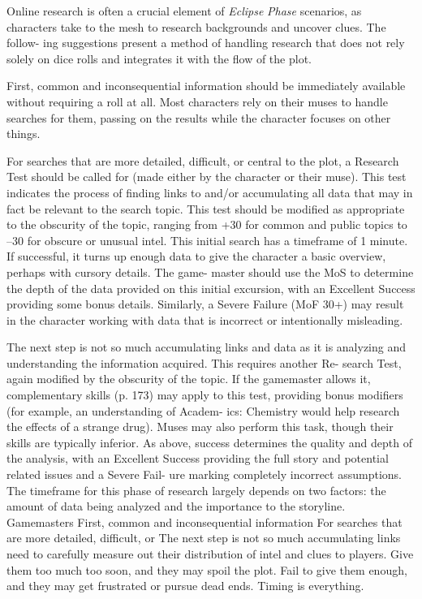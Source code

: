 Online research is often a crucial element of \textit{Eclipse }
\textit{Phase} scenarios, as characters take to the mesh to 
research backgrounds and uncover clues. The follow-
ing suggestions present a method of handling research 
that does not rely solely on dice rolls and integrates it 
with the flow of the plot.

First, common and inconsequential information 
should be immediately available without requiring 
a roll at all. Most characters rely on their muses to 
handle searches for them, passing on the results while 
the character focuses on other things.

For searches that are more detailed, difficult, or 
central to the plot, a Research Test should be called 
for (made either by the character or their muse). 
This test indicates the process of finding links to 
and/or accumulating all data that may in fact be 
relevant to the search topic. This test should be 
modified as appropriate to the obscurity of the topic, 
ranging from +30 for common and public topics 
to –30 for obscure or unusual intel. This initial 
search has a timeframe of 1 minute. If successful, it 
turns up enough data to give the character a basic 
overview, perhaps with cursory details. The game-
master should use the MoS to determine the depth 
of the data provided on this initial excursion, with 
an Excellent Success providing some bonus details. 
Similarly, a Severe Failure (MoF 30+) may result in 
the character working with data that is incorrect or 
intentionally misleading.

The next step is not so much accumulating links 
and data as it is analyzing and understanding the 
information acquired. This requires another Re-
search Test, again modified by the obscurity of the 
topic. If the gamemaster allows it, complementary 
skills (p. 173) may apply to this test, providing bonus 
modifiers (for example, an understanding of Academ-
ics: Chemistry would help research the effects of a 
strange drug). Muses may also perform this task, 
though their skills are typically inferior. As above, 
success determines the quality and depth of the 
analysis, with an Excellent Success providing the full 
story and potential related issues and a Severe Fail-
ure marking completely incorrect assumptions. The 
timeframe for this phase of research largely depends 
on two factors: the amount of data being analyzed 
and the importance to the storyline. Gamemasters 
First, common and inconsequential information 
For searches that are more detailed, difficult, or 
The next step is not so much accumulating links 
need to carefully measure out their distribution of 
intel and clues to players. Give them too much too 
soon, and they may spoil the plot. Fail to give them 
enough, and they may get frustrated or pursue dead 
ends. Timing is everything.

